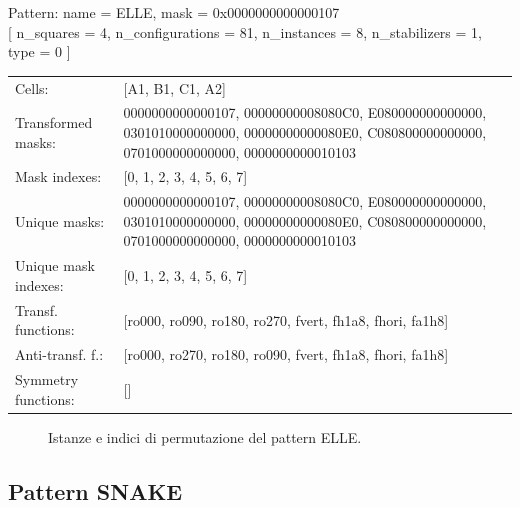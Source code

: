 \begin{tcolorbox}[sharp corners, fontupper=\ttfamily\small, colback=white]
  \noindent Pattern: name = ELLE, mask = 0x0000000000000107\\
  {[} n\_squares = 4, n\_configurations = 81,
  n\_instances = 8, n\_stabilizers = 1, type = 0 { ]}\\[1.0ex]
  \begin{tabularx}{\textwidth}{@{} p{3.5cm} X @{}}
    Cells:               & {[}A1, B1, C1, A2{]}\\[0.5ex]
    Transformed masks:   & 0000000000000107, 00000000008080C0, E080000000000000, 0301010000000000, 00000000000080E0, C080800000000000, 0701000000000000, 0000000000010103\\[0.5ex]
    Mask indexes:        & {[}0, 1, 2, 3, 4, 5, 6, 7{]}\\[0.5ex]
    Unique masks:        & 0000000000000107, 00000000008080C0, E080000000000000, 0301010000000000, 00000000000080E0, C080800000000000, 0701000000000000, 0000000000010103\\[0.5ex]
    Unique mask indexes: & {[}0, 1, 2, 3, 4, 5, 6, 7{]}\\[0.5ex]
    Transf. functions:   & {[}ro000, ro090, ro180, ro270, fvert, fh1a8, fhori, fa1h8{]}\\[0.5ex]
    Anti-transf. f.:     & {[}ro000, ro270, ro180, ro090, fvert, fh1a8, fhori, fa1h8{]}\\[0.5ex]
    Symmetry functions:  & {[}{]}\\[0.5ex]
  \end{tabularx}
\end{tcolorbox}

\begin{figure}[htbp]
  \centering
   \hfill
   \hfill
   \hfill
  \vspace{0.3cm}
   \hfill
   \hfill
   \hfill
  \caption{Istanze e indici di permutazione del pattern ELLE.}
\end{figure}

\newpage

\subsection{Pattern SNAKE}

